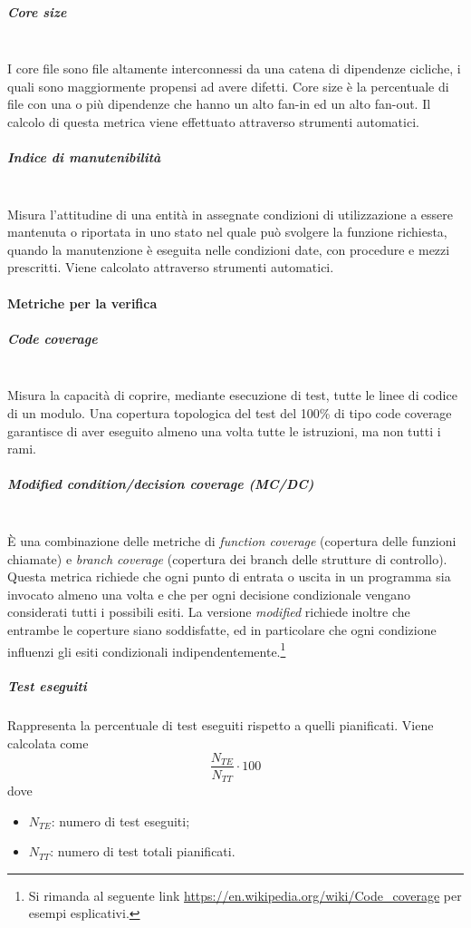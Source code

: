 \subparagraph{Core size}\mbox{}\\
I core file sono file altamente interconnessi da una catena di dipendenze cicliche, i quali sono maggiormente propensi ad avere difetti. Core size è la percentuale di file con una o più dipendenze che hanno un alto fan-in ed un alto fan-out. Il calcolo di questa metrica viene effettuato attraverso strumenti automatici.

\subparagraph{Indice di manutenibilità}\mbox{}\\
Misura l’attitudine di una entità in assegnate condizioni di utilizzazione a essere mantenuta o riportata in uno stato nel quale può svolgere la funzione richiesta, quando la manutenzione è eseguita nelle condizioni date, con procedure e mezzi prescritti. Viene calcolato attraverso strumenti automatici.

\paragraph{Metriche per la verifica}\mbox{}
\subparagraph{Code coverage}\mbox{}\\
Misura la capacità di coprire, mediante esecuzione di test, tutte le linee di codice di un modulo. Una copertura topologica del test del 100\% di tipo code coverage garantisce di aver eseguito almeno una volta tutte le istruzioni, ma non tutti i rami.

\subparagraph{Modified condition/decision coverage (MC/DC)}\mbox{}\\
\`{E} una combinazione delle metriche di \textit{function coverage} (copertura delle funzioni chiamate) e \textit{branch coverage} (copertura dei branch delle strutture di controllo). Questa metrica richiede che ogni punto di entrata o uscita in un programma sia invocato almeno una volta e che per ogni decisione condizionale vengano considerati tutti i possibili esiti. La versione \textit{modified} richiede inoltre che entrambe le coperture siano soddisfatte, ed in particolare che ogni condizione influenzi gli esiti condizionali indipendentemente.\footnote{Si rimanda al seguente link \url{https://en.wikipedia.org/wiki/Code_coverage} per esempi esplicativi.}

\subparagraph{Test eseguiti}\mbox{}
Rappresenta la percentuale di test eseguiti rispetto a quelli pianificati. Viene calcolata come
\[\frac{N_{TE}}{N_{TT}} \cdot 100 \]
dove
\begin{itemize}
	\item $N_{TE}$: numero di test eseguiti;
	\item $N_{TT}$: numero di test totali pianificati.
\end{itemize}

